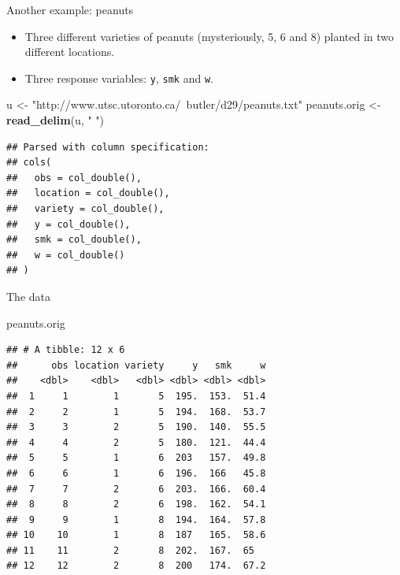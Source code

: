 \documentclass[ignorenonframetext,]{beamer}
\newenvironment{Shaded}{\begin{snugshade}}{\end{snugshade}}
\newcommand{\KeywordTok}[1]{\textcolor[rgb]{0.13,0.29,0.53}{\textbf{#1}}}
\newcommand{\NormalTok}[1]{#1}
\newcommand{\StringTok}[1]{\textcolor[rgb]{0.31,0.60,0.02}{#1}}
\begin{document}
\begin{frame}[fragile]{Another example: peanuts}
\protect\hypertarget{another-example-peanuts}{}

\begin{itemize}
\item
  Three different varieties of peanuts (mysteriously, 5, 6 and 8)
  planted in two different locations.
\item
  Three response variables: \texttt{y}, \texttt{smk} and \texttt{w}.
\end{itemize}

\begin{Shaded}
\begin{Highlighting}[]
\NormalTok{u <-}\StringTok{ "http://www.utsc.utoronto.ca/~butler/d29/peanuts.txt"}
\NormalTok{peanuts.orig <-}\StringTok{ }\KeywordTok{read_delim}\NormalTok{(u, }\StringTok{" "}\NormalTok{)}
\end{Highlighting}
\end{Shaded}

\begin{verbatim}
## Parsed with column specification:
## cols(
##   obs = col_double(),
##   location = col_double(),
##   variety = col_double(),
##   y = col_double(),
##   smk = col_double(),
##   w = col_double()
## )
\end{verbatim}

\end{frame}

\begin{frame}[fragile]{The data}
\protect\hypertarget{the-data-10}{}

\small

\begin{Shaded}
\begin{Highlighting}[]
\NormalTok{peanuts.orig}
\end{Highlighting}
\end{Shaded}

\begin{verbatim}
## # A tibble: 12 x 6
##      obs location variety     y   smk     w
##    <dbl>    <dbl>   <dbl> <dbl> <dbl> <dbl>
##  1     1        1       5  195.  153.  51.4
##  2     2        1       5  194.  168.  53.7
##  3     3        2       5  190.  140.  55.5
##  4     4        2       5  180.  121.  44.4
##  5     5        1       6  203   157.  49.8
##  6     6        1       6  196.  166   45.8
##  7     7        2       6  203.  166.  60.4
##  8     8        2       6  198.  162.  54.1
##  9     9        1       8  194.  164.  57.8
## 10    10        1       8  187   165.  58.6
## 11    11        2       8  202.  167.  65  
## 12    12        2       8  200   174.  67.2
\end{verbatim}

\normalsize

\end{frame}
\end{document}
